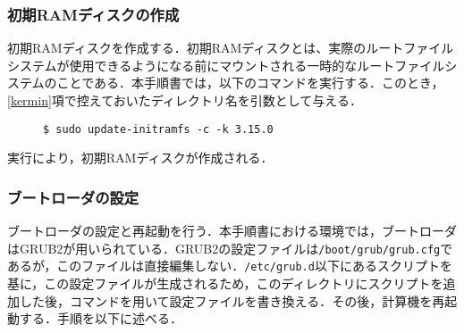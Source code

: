 \documentclass[12pt]{jsarticle}
\begin{document}
\subsubsection{初期RAMディスクの作成}
初期RAMディスクを作成する．初期RAMディスクとは、実際のルートファイルシステムが使用できるようになる前にマウントされる一時的なルートファイルシステムのことである．本手順書では，以下のコマンドを実行する．このとき，\ref{kermin}項で控えておいたディレクトリ名を引数として与える．
\begin{description}
\item[] \verb|$ sudo update-initramfs -c -k 3.15.0|
\end{description}
実行により，初期RAMディスクが作成される．
\subsubsection{ブートローダの設定}\label{boot}
ブートローダの設定と再起動を行う．本手順書における環境では，ブートローダはGRUB2が用いられている．GRUB2の設定ファイルは\verb|/boot/grub/grub.cfg|であるが，このファイルは直接編集しない．\verb|/etc/grub.d|以下にあるスクリプトを基に，この設定ファイルが生成されるため，このディレクトリにスクリプトを追加した後，コマンドを用いて設定ファイルを書き換える．その後，計算機を再起動する．手順を以下に述べる．
\end{document}
